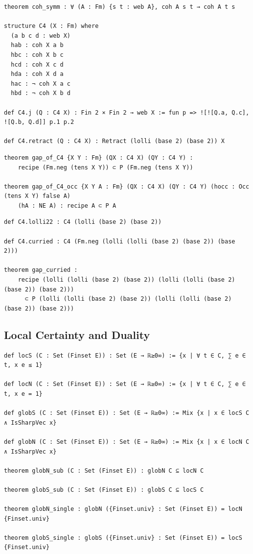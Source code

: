 \begin{lstlisting}
theorem coh_symm : ∀ (A : Fm) {s t : web A}, coh A s t → coh A t s

structure C4 (X : Fm) where
  (a b c d : web X)
  hab : coh X a b
  hbc : coh X b c
  hcd : coh X c d
  hda : coh X d a
  hac : ¬ coh X a c
  hbd : ¬ coh X b d

def C4.j (Q : C4 X) : Fin 2 × Fin 2 → web X := fun p => ![![Q.a, Q.c], ![Q.b, Q.d]] p.1 p.2

def C4.retract (Q : C4 X) : Retract (lolli (base 2) (base 2)) X
\end{lstlisting}

\begin{lstlisting}
theorem gap_of_C4 {X Y : Fm} (QX : C4 X) (QY : C4 Y) :
    recipe (Fm.neg (tens X Y)) ⊂ P (Fm.neg (tens X Y))

theorem gap_of_C4_occ {X Y A : Fm} (QX : C4 X) (QY : C4 Y) (hocc : Occ (tens X Y) false A)
    (hA : NE A) : recipe A ⊂ P A
\end{lstlisting}

\begin{lstlisting}
def C4.lolli22 : C4 (lolli (base 2) (base 2))

def C4.curried : C4 (Fm.neg (lolli (lolli (base 2) (base 2)) (base 2)))

theorem gap_curried :
    recipe (lolli (lolli (base 2) (base 2)) (lolli (lolli (base 2) (base 2)) (base 2)))
      ⊂ P (lolli (lolli (base 2) (base 2)) (lolli (lolli (base 2) (base 2)) (base 2)))
\end{lstlisting}

\subsection{Local Certainty and Duality}

\begin{lstlisting}
def locS (C : Set (Finset E)) : Set (E → ℝ≥0∞) := {x | ∀ t ∈ C, ∑ e ∈ t, x e ≤ 1}

def locN (C : Set (Finset E)) : Set (E → ℝ≥0∞) := {x | ∀ t ∈ C, ∑ e ∈ t, x e = 1}

def globS (C : Set (Finset E)) : Set (E → ℝ≥0∞) := Mix {x | x ∈ locS C ∧ IsSharpVec x}

def globN (C : Set (Finset E)) : Set (E → ℝ≥0∞) := Mix {x | x ∈ locN C ∧ IsSharpVec x}

theorem globN_sub (C : Set (Finset E)) : globN C ⊆ locN C

theorem globS_sub (C : Set (Finset E)) : globS C ⊆ locS C

theorem globN_single : globN ({Finset.univ} : Set (Finset E)) = locN {Finset.univ}

theorem globS_single : globS ({Finset.univ} : Set (Finset E)) = locS {Finset.univ}
\end{lstlisting}

